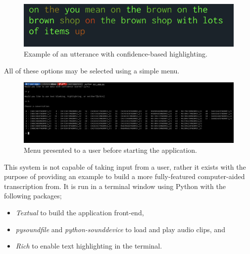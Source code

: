 \begin{figure}[H]
  \centering
  \includegraphics[width=\textwidth]{images/text-highlighting.png}
  \caption{Example of an utterance with confidence-based highlighting.}
  \label{fig:sys-highlighting}
\end{figure}

All of these options may be selected using a simple menu.

\begin{figure}[H]
  \centering
  \includegraphics[width=\textwidth]{images/menu.png}
  \caption{Menu presented to a user before starting the application.}
  \label{fig:sys-menu}
\end{figure}

This system is not capable of taking input from a user, rather it exists with the purpose of providing an example to build a more fully-featured computer-aided transcription from.
It is run in a terminal window using Python with the following packages;

\begin{itemize}
  \item \emph{Textual}\cite{textual} to build the application front-end,
  \item \emph{pysoundfile}\cite{pysoundfile} and \emph{python-sounddevice}\cite{pysounddevice} to load and play audio clips, and
  \item \emph{Rich}\cite{rich} to enable text highlighting in the terminal.
\end{itemize}
